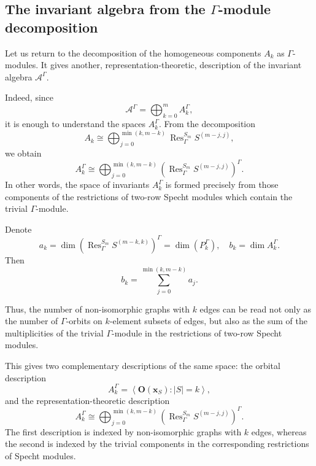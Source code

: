\documentclass[12pt,reqno]{amsart}
\begin{document}
\subsection{The invariant algebra from the $\Gamma$-module decomposition}

Let us return to the decomposition of the homogeneous components $A_k$ as
$\Gamma$-modules. It gives another, representation-theoretic, description of
the invariant algebra $\mathcal A^\Gamma$.

Indeed, since
$$
\mathcal A^\Gamma=\bigoplus_{k=0}^{m}A_k^\Gamma,
$$
it is enough to understand the spaces $A_k^\Gamma$. From the decomposition
$$
A_k
\cong
\bigoplus_{j=0}^{\min(k,m-k)}
\operatorname{Res}^{S_m}_{\Gamma}S^{(m-j,j)},
$$
we obtain
$$
A_k^\Gamma
\cong
\bigoplus_{j=0}^{\min(k,m-k)}
\left(
\operatorname{Res}^{S_m}_{\Gamma}S^{(m-j,j)}
\right)^\Gamma.
$$
In other words, the space of invariants $A_k^\Gamma$ is formed precisely
from those components of the restrictions of two-row Specht modules which
contain the trivial $\Gamma$-module.

Denote
$$
a_k
=
\dim
\left(
\operatorname{Res}^{S_m}_{\Gamma}S^{(m-k,k)}
\right)^\Gamma = \dim( P_k^\Gamma), \quad  b_k=\dim A_k^\Gamma.
$$
Then
\begin{equation}\label{dim_AG}
b_k=
\sum_{j=0}^{\min(k,m-k)}a_j.
\end{equation}

Thus, the number of non-isomorphic graphs with $k$ edges can be read not only
as the number of $\Gamma$-orbits on $k$-element subsets of edges, but also as
the sum of the multiplicities of the trivial $\Gamma$-module in the
restrictions of two-row Specht modules.

This gives two complementary descriptions of the same space: the orbital
description
$$
A_k^\Gamma
=
\left\langle
\mathbf O(\boldsymbol{x}_S): |S|=k
\right\rangle,
$$
and the representation-theoretic description
$$
A_k^\Gamma
\cong
\bigoplus_{j=0}^{\min(k,m-k)}
\left(
\operatorname{Res}^{S_m}_{\Gamma}S^{(m-j,j)}
\right)^\Gamma.
$$
The first description is indexed by non-isomorphic graphs with $k$ edges,
whereas the second is indexed by the trivial components in the corresponding
restrictions of Specht modules.
\end{document}
